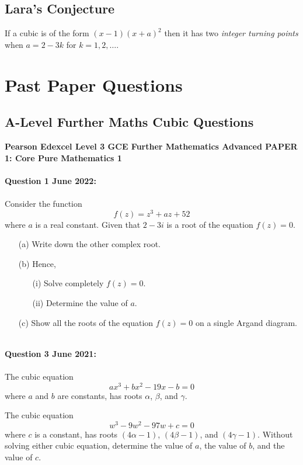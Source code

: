 \documentclass[12pt]{article}
\begin{document}
\subsection{Lara's Conjecture}
If a cubic is of the form $(x-1)(x+a)^2$ then it has two \textit{integer turning points} when $a = 2-3k$ for $k = 1, 2, \dots$.

\section{Past Paper Questions}

\subsection{A-Level Further Maths Cubic Questions}
\textbf{Pearson Edexcel Level 3 GCE Further Mathematics
Advanced PAPER 1: Core Pure Mathematics 1}\\\\
\textbf{Question 1 June 2022:}\\\\
Consider the function 
\[f(z) = z^3 + az + 52\]
where \( a \) is a real constant. Given that \( 2 - 3i \) is a root of the equation \( f(z) = 0 \).
\begin{enumerate}
    \item[(a)] Write down the other complex root.
    \item[(b)] Hence,
    \begin{enumerate}
        \item[(i)] Solve completely \( f(z) = 0 \).
        \item[(ii)] Determine the value of \( a \).
    \end{enumerate}
    \item[(c)] Show all the roots of the equation \( f(z) = 0 \) on a single Argand diagram.\\\\
\end{enumerate}

\textbf{Question 3 June 2021:}\\\\
The cubic equation
\[ax^3 + bx^2 - 19x - b = 0\]
where \( a \) and \( b \) are constants, has roots \( \alpha \), \( \beta \), and \( \gamma \).

The cubic equation
\[w^3 - 9w^2 - 97w + c = 0\]
where \( c \) is a constant, has roots \( (4\alpha - 1) \), \( (4\beta - 1) \), and \( (4\gamma - 1) \).
Without solving either cubic equation, determine the value of \( a \), the value of \( b \), and the value of \( c \).\\\\
\end{document}
